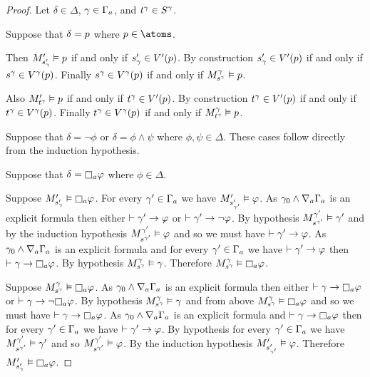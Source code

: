 \begin{proof}
Let $\delta \in \Delta$, $\gamma \in \Gamma_\agentA$, and $\kStateT[\gamma] \in \kStates[\gamma]$.

Suppose that $\delta = \atomP$ where $\atomP \in \atoms$.

Then $\kPModelP{\kStateSP_\gamma} \entails \atomP$ if and only if $\kStateSP_\gamma \in \kValuationP(\atomP)$.
By construction $\kStateSP_\gamma \in \kValuationP(\atomP)$ if and only if $\kStateS[\gamma] \in \kValuation[\gamma](\atomP)$.
Finally $\kStateS[\gamma] \in \kValuation[\gamma](\atomP)$ if and only if $\kPModel[\gamma]{\kStateS[\gamma]} \entails \atomP$.

Also $\kPModelP{\kStateT[\gamma]} \entails \atomP$ if and only if $\kStateT[\gamma] \in \kValuationP(\atomP)$.
By construction $\kStateT[\gamma] \in \kValuationP(\atomP)$ if and only if $\kStateT[\gamma] \in \kValuation[\gamma](\atomP)$.
Finally $\kStateT[\gamma] \in \kValuation[\gamma](\atomP)$ if and only if $\kPModel[\gamma]{\kStateT[\gamma]} \entails \atomP$.

Suppose that $\delta = \lnot \phi$ or $\delta = \phi \land \psi$ where $\phi, \psi \in \Delta$.
These cases follow directly from the induction hypothesis.

Suppose that $\delta = \necessaryA \phi$ where $\phi \in \Delta$. 

Suppose $\kPModelP{\kStateSP_\gamma} \entails \necessaryA \phi$.
For every $\gamma' \in \Gamma_\agentA$ we have $\kPModelP{\kStateSP_{\gamma'}} \entails \phi$.
As $\gamma_0 \land \coversA \Gamma_\agentA$ is an explicit formula then either $\proves \gamma' \implies \phi$ or $\proves \gamma' \implies \lnot \phi$.
By hypothesis $\kPModel[\gamma']{\kStateS[\gamma']} \entails \gamma'$ and by the induction hypothesis $\kPModel[\gamma']{\kStateS[\gamma']} \entails \phi$ and so we must have $\proves \gamma' \implies \phi$.
As $\gamma_0 \land \coversA \Gamma_\agentA$ is an explicit formula and for every $\gamma' \in \Gamma_\agentA$ we have $\proves \gamma' \implies \phi$ then $\proves \gamma \implies \necessaryA \phi$.
By hypothesis $\kPModel[\gamma]{\kStateS[\gamma]} \entails \gamma$.
Therefore $\kPModel[\gamma]{\kStateS[\gamma]} \entails \necessaryA \phi$.

Suppose $\kPModel[\gamma]{\kStateS[\gamma]} \entails \necessaryA \phi$.
As $\gamma_0 \land \coversA \Gamma_\agentA$ is an explicit formula then either $\proves \gamma \implies \necessaryA \phi$ or $\proves \gamma \implies \lnot \necessaryA \phi$.
By hypothesis $\kPModel[\gamma]{\kStateS[\gamma]} \entails \gamma$ and from above $\kPModel[\gamma]{\kStateS[\gamma]} \entails \necessaryA \phi$ and so we must have $\proves \gamma \implies \necessaryA \phi$.
As $\gamma_0 \land \coversA \Gamma_\agentA$ is an explicit formula and $\proves \gamma \implies \necessaryA \phi$ then for every $\gamma' \in \Gamma_\agentA$ we have $\proves \gamma' \implies \phi$.
By hypothesis for every $\gamma' \in \Gamma_\agentA$ we have $\kPModel[\gamma']{\kStateS[\gamma']} \entails \gamma'$ and so $\kPModel[\gamma']{\kStateS[\gamma']} \entails \phi$.
By the induction hypothesis $\kPModelP{\kStateSP_{\gamma'}} \entails \phi$.
Therefore $\kPModelP{\kStateSP_\gamma} \entails \necessaryA \phi$.


\end{proof}
